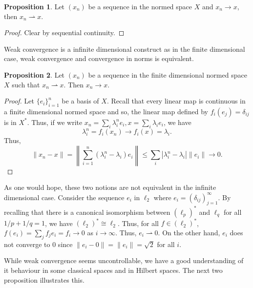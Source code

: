 \documentclass[]{article}
\theoremstyle{definition}
\theoremstyle{definition}
\newtheorem{proposition}{Proposition}[section]
\newcommand{\weak}{\rightharpoonup}
\begin{document}
\begin{proposition}
  Let \((x_n)\) be a sequence in the normed space \(X\) and \(x_n \to x\), 
  then \(x_n \weak x\).
\end{proposition}
\begin{proof}
  Clear by sequential continuity.
\end{proof}

Weak convergence is a infinite dimensional construct as in the finite dimensional 
case, weak convergence and convergence in norms is equivalent.

\begin{proposition}
  Let \((x_n)\) be a sequence in the finite dimensional normed space \(X\) 
  such that \(x_n \weak x\). Then \(x_n \to x\).
\end{proposition}
\begin{proof}
  Let \(\{e_i\}_{i = 1}^n\) be a basis of \(X\). Recall that every linear map 
  is continuous in a finite dimensional normed space and so, the linear map 
  defined by \(f_i(e_j) = \delta_{ij}\) is in \(X^*\). Thus, if we write 
  \(x_n = \sum_i \lambda_i^n e_i, x = \sum_i \lambda_i e_i\), we have 
  \[\lambda_i^n = f_i(x_n) \to f_i(x) = \lambda_i.\]
  Thus, 
  \[\|x_n - x\| = \left\|\sum_{i = 1}^n (\lambda_i^n - \lambda_i)e_i \right\| 
  \le \sum_i |\lambda_i^n - \lambda_i| \|e_i\| \to 0.\] 
\end{proof}

As one would hope, these two notions are not equivalent in the infinite dimensional 
case. Consider the sequence \(e_i\) in \(\ell_2\) where 
\(e_i = (\delta_{ij})_{j = 1}^\infty\). By recalling that there is a 
canonical isomorphism between \((\ell_p)^*\) and \(\ell_q\) for all 
\(1 / p + 1 / q = 1\), we have \((\ell_2)^* \cong \ell_2\). Thus, for all 
\(f \in (\ell_2)^*\), \(f(e_i) = \sum_j f_je_i = f_i \to 0\) as \(i \to \infty\).
Thus, \(e_i \weak 0\). On the other hand, \(e_i\) does not converge to \(0\) since 
\(\|e_i - 0\| = \|e_i\| = \sqrt{2}\) for all \(i\).

While weak convergence seems uncontrollable, we have a good understanding 
of it behaviour in some classical spaces and in Hilbert spaces. The next 
two proposition illustrates this.
\end{document}
